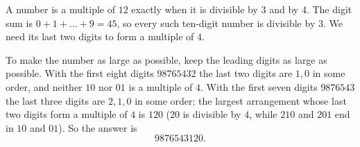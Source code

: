 A number is a multiple of $12$ exactly when it is divisible by $3$ and by $4$. The digit sum is $0+1+\dots+9=45$, so every such ten-digit number is divisible by $3$. We need its last two digits to form a multiple of $4$.

To make the number as large as possible, keep the leading digits as large as possible. With the first eight digits $98765432$ the last two digits are $1,0$ in some order, and neither $10$ nor $01$ is a multiple of $4$. With the first seven digits $9876543$ the last three digits are $2,1,0$ in some order; the largest arrangement whose last two digits form a multiple of $4$ is $120$ ($20$ is divisible by $4$, while $210$ and $201$ end in $10$ and $01$). So the answer is
\[
\boxed{9876543120}.
\]
